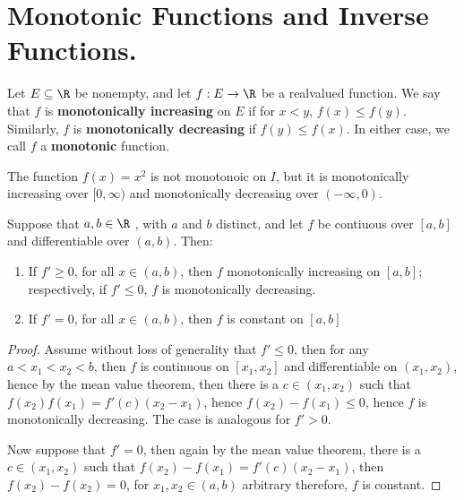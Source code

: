 
\section{Monotonic Functions and Inverse Functions.}

\begin{definition}
    Let $E \subseteq \R$ be nonempty, and let  $f:E \rightarrow \R$ be a realvalued function. 
    We say that $f$ is \textbf{monotonically increasing} on $E$ if for $x<y$, $f(x) \leq f(y)$. 
    Similarly, $f$ is \textbf{monotonically decreasing} if $f(y) \leq f(x)$. In either case, we call 
    $f$ a \textbf{monotonic} function.
\end{definition}

\begin{example}
    The function $f(x)=x^2$ is not monotonoic on  $I$, but it is monotonically increasing 
    over $[0,\infty)$ and monotonically decreasing over $(-\infty, 0)$. 
\end{example} 

\begin{theorem}\label{4.4.1}
    Suppose that $a, b \in \R$ , with  $a$ and  $b$ distinct, and let  $f$ be contiuous 
    over  $[a,b]$ and differentiable over  $(a,b)$. Then:
        \begin{enumerate}[label=(\arabic*)]
            \item If $f' \geq 0$, for all  $x \in (a,b)$, then $f$ monotonically increasing 
                on $[a,b]$; respectively, if  $f' \leq 0$,  $f$ is monotonically decreasing.

            \item If $f'=0$, for all  $x \in (a,b)$, then $f$ is constant on  $[a,b]$
        \end{enumerate}
\end{theorem}
\begin{proof}
    Assume without loss of generality that $f' \leq 0$, then for any  $a<x_1<x_2<b$, then 
    $f$ is continuous on  $[x_1,x_2]$ and differentiable on $(x_1,x_2)$, hence by the 
    mean value theorem, then there is a $c \in (x_1,x_2)$ such that $f(x_2)f(x_1)=f'(c)(x_2-x_1)$, 
    hence $f(x_2)-f(x_1) \leq 0$, hence $f$ is monotonically decreasing. The case is analogous 
    for  $f'>0$.

    Now suppose that  $f'=0$,  then again by the mean value theorem, there is a  $c \in (x_1,x_2)$ 
    such that $f(x_2)-f(x_1)=f'(c)(x_2-x_1)$, then $f(x_2)-f(x_2)=0$, for $x_1, x_2 \in (a,b)$ 
    arbitrary therefore, $f$ is constant.
\end{proof}

